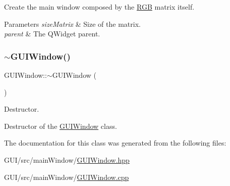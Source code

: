 Create the main window composed by the \mbox{\hyperlink{class_r_g_b}{R\+GB}} matrix itself. 


\begin{DoxyParams}{Parameters}
{\em size\+Matrix} & Size of the matrix. \\
\hline
{\em parent} & The Q\+Widget parent. \\
\hline
\end{DoxyParams}
\mbox{\label{class_g_u_i_window_a9c6d4277ffc74763b0a19fcdf15a5b7c}} 
\subsubsection{\texorpdfstring{$\sim$\+G\+U\+I\+Window()}{~GUIWindow()}}
{\footnotesize\ttfamily G\+U\+I\+Window\+::$\sim$\+G\+U\+I\+Window (\begin{DoxyParamCaption}{ }\end{DoxyParamCaption})}



Destructor. 

Destructor of the \mbox{\hyperlink{class_g_u_i_window}{G\+U\+I\+Window}} class. 

The documentation for this class was generated from the following files\+:\begin{DoxyCompactItemize}
\item 
G\+U\+I/src/main\+Window/\mbox{\hyperlink{_g_u_i_window_8hpp}{G\+U\+I\+Window.\+hpp}}\item 
G\+U\+I/src/main\+Window/\mbox{\hyperlink{_g_u_i_window_8cpp}{G\+U\+I\+Window.\+cpp}}\end{DoxyCompactItemize}

